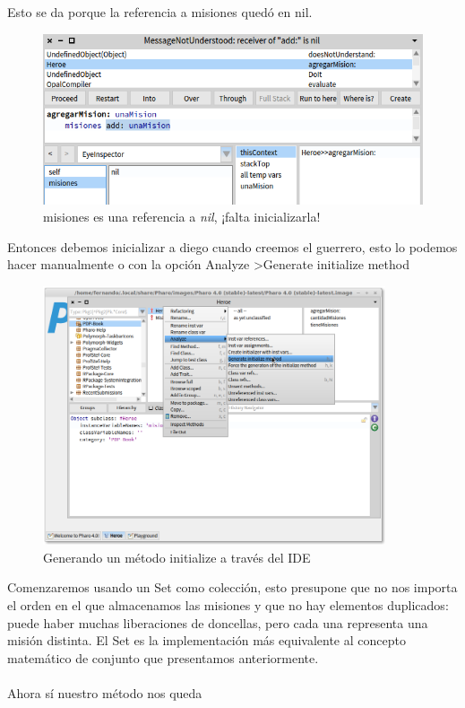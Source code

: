 \documentclass[a4paper,12pt]{book}
\begin{document}
Esto se da porque la referencia a misiones quedó en nil. 

\begin{figure}[h!]
    \centering	
    \includegraphics[width=1\textwidth]{images/12_error_debugging_2.png}
    \caption{misiones es una referencia a \textit{nil}, ¡falta inicializarla!}
\end{figure}
\FloatBarrier

Entonces debemos inicializar a diego cuando creemos el guerrero, esto lo podemos hacer manualmente o con la opción
Analyze \textgreater Generate initialize method

\begin{figure}[h!]
    \centering	
    \includegraphics[width=0.9\textwidth]{images/13_generate_initialize.png}
    \caption{Generando un método initialize a través del IDE}
\end{figure}
\FloatBarrier

Comenzaremos usando un Set como colección, esto presupone que no nos importa el orden en el que almacenamos las
misiones y que no hay elementos duplicados: puede haber muchas liberaciones de doncellas, pero cada una 
representa una misión distinta. El Set es la implementación más equivalente al concepto matemático de conjunto
que presentamos anteriormente.
\\
\\
Ahora sí nuestro método nos queda
\end{document}
